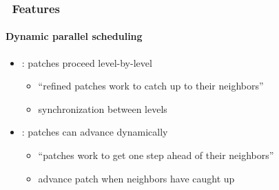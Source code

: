 \begin{frame}[fragile] 
\frametitle{\cello\ Features}
\framesubtitle{Dynamic parallel scheduling}
\begin{itemize}
\item{}\enzo: patches proceed level-by-level
\begin{itemize}
\item{}   ``refined patches work to catch up to their neighbors''
\item{}   synchronization between levels
\end{itemize}
\item{}\cello: patches can advance dynamically
\begin{itemize}
\item{}   ``patches work to get one step ahead of their neighbors''
\item{}     advance patch when neighbors have caught up
\end{itemize}
\end{itemize}
\end{frame}
